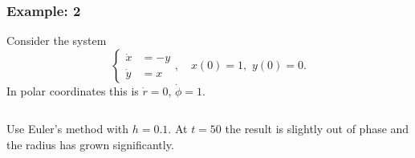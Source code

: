\documentclass{beamer}
\begin{document}
\begin{frame}
  \frametitle{Example: 2}


  Consider the system
  \begin{equation*}
    \left\{
      \begin{aligned}
        \dot{x} & = -y \\ \dot{y} & = x
      \end{aligned} \right., \quad x(0) = 1, \, \, y(0) = 0.
  \end{equation*}
  In polar coordinates this is $\dot{r} = 0$, $\dot{\phi} = 1$.
  \begin{columns}
    \begin{column}{0.5\textwidth}
      \begin{overlayarea}{\textwidth}{0.4\textheight}
        {
          Use Euler's method with $h=0.1$. At $t=50$ the result is
          slightly out of phase and the radius has grown
          significantly.

        }
        {
          \vspace{1ex}

}
\end{overlayarea}
\end{column}
\end{columns}
\end{frame}
\end{document}
